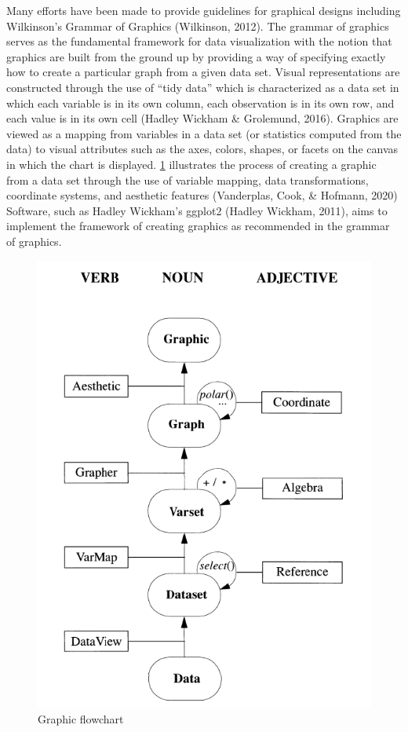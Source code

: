 \documentclass[print]{nuthesis}
\begin{document}
Many efforts have been made to provide guidelines for graphical designs including Wilkinson's Grammar of Graphics (Wilkinson, 2012).
The grammar of graphics serves as the fundamental framework for data visualization with the notion that graphics are built from the ground up by providing a way of specifying exactly how to create a particular graph from a given data set.
Visual representations are constructed through the use of ``tidy data'' which is characterized as a data set in which each variable is in its own column, each observation is in its own row, and each value is in its own cell (Hadley Wickham \& Grolemund, 2016).
Graphics are viewed as a mapping from variables in a data set (or statistics computed from the data) to visual attributes such as the axes, colors, shapes, or facets on the canvas in which the chart is displayed.
\cref{fig:graphic-flowchart} illustrates the process of creating a graphic from a data set through the use of variable mapping, data transformations, coordinate systems, and aesthetic features (Vanderplas, Cook, \& Hofmann, 2020)
Software, such as Hadley Wickham's ggplot2 (Hadley Wickham, 2011), aims to implement the framework of creating graphics as recommended in the grammar of graphics.

\begin{figure}[tbp]

{\centering \includegraphics[width=0.5\linewidth,]{images/graphic-flowchart} 

}

\caption{Graphic flowchart}\label{fig:graphic-flowchart}
\end{figure}
\end{document}
